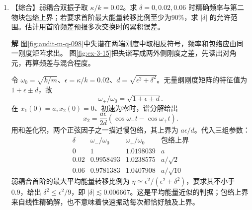 \documentclass[11pt,openany,fontset=fandol]{ctexbook}
\theoremstyle{plain}\newtheorem{theorem}{定理}[chapter]\newtheorem{proposition}[theorem]{命题}
\theoremstyle{definition}\newtheorem{definition}{定义}[chapter]\newtheorem{example}{例}[chapter]
\theoremstyle{remark}\newtheorem*{remark}{说明}
\newcommand{\SolutionStart}{\par\nobreak\medskip\nobreak\noindent\textbf{解}\quad\ignorespaces}
\newenvironment{solution}{\SolutionStart}{\par\medskip}
\newcommand{\vct}[1]{\bm{#1}}\newcommand{\Rea}{\operatorname{Re}}\newcommand{\Ima}{\operatorname{Im}}
\begin{document}
\begin{enumerate}[label=3.\arabic*]
\begin{solution}
\begin{figure}[H]\centering
{}
\caption{题3.14解图：连线方向为零主惯量轴 $\vct n_1$，平面内垂直方向为 $\vct n_2$，第三轴为出纸面的 $z$ 轴。图示取 $a,b>0$。}\label{fig:ex-3-14}
\end{figure}

连线轴上两质点的垂距都为零；另外任意一根垂直轴到各点的距离均为 $\sqrt{a^2+b^2}$，解释了两重主惯量。
\end{solution}

\item \begin{minipage}[t]{\linewidth}
【综合】弱耦合双振子取 $\kappa/k=0.02$。求 $\delta=0,0.02,0.06$ 时精确频率与第二物块包络上界；若要求首阶最大能量转移比例至少为90\%，求 $|\delta|$ 的允许范围。估计用首阶频差预报多次交换时的累积误差。

\end{minipage}

\begin{solution}
图\ref{fig:audit-m-q-098}中失谐在两端刚度中取相反符号，频率和包络应由同一刚度矩阵求出。
图\ref{fig:ex-3-15}把失谐写成两外侧刚度之差，先读出对角元，再算频差与混合程度。

令 $\omega_0=\sqrt{k/m}$、$\epsilon=\kappa/k=0.02$、$d=\sqrt{\epsilon^2+\delta^2}$。无量纲刚度矩阵的特征值为 $1+\epsilon\pm d$，故
\[
\omega_\pm/\omega_0=\sqrt{1+\epsilon\pm d}.
\]
在 $x_1(0)=a,x_2(0)=0$、初速为零时，谱分解给出
\[
x_2=\frac{a\epsilon}{2d}(\cos\omega_-t-\cos\omega_+t).
\]
用和差化积，两个正弦因子之一描述慢包络，其上界为 $a\epsilon/d$。代入三组参数：
\[
\begin{array}{c|ccc}
\delta&\omega_-/\omega_0&\omega_+/\omega_0&\text{包络上界}\\\hline
0&1&1.0198039&a\\
0.02&0.9958493&1.0238575&a/\sqrt2\\
0.06&0.9781383&1.0407908&a/\sqrt{10}
\end{array}
\]
弱耦合首阶的最大平均能量转移比例为 $\eta\simeq\epsilon^2/(\epsilon^2+\delta^2)$，要求其不小于0.9，给出 $\delta^2\le\epsilon^2/9$，即 $|\delta|\lesssim0.006667$。这是平均能量近似的判据；包络上界来自线性精确解，也不意味着快速振动每次都恰好触及上界。


\end{solution}
\end{enumerate}
\end{document}
